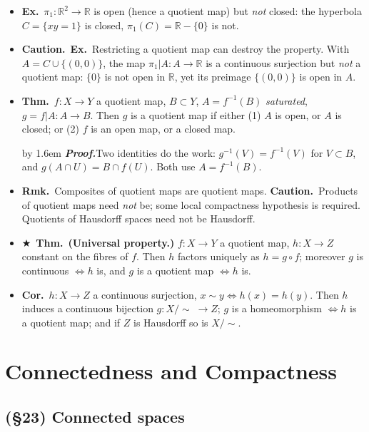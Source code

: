 \documentclass[12pt,a4paper]{article}
\newcommand{\Thm}{\textbf{Thm.}~}
\newcommand{\Cor}{\textbf{Cor.}~}
\newcommand{\Exa}{\textbf{Ex.}~}
\newcommand{\Rmk}{\textbf{Rmk.}~}
\newcommand{\Warn}{\textbf{Caution.}~}
\newcommand{\Key}{$\bigstar$~}                  %
\newcommand{\Pf}[1]{%
  \par\addvspace{7pt}\nopagebreak
  \begingroup
    \advance\leftskip by 1.6em
    \parindent=0pt \small\color{prf}%
    \textbf{\textit{Proof.}}\enspace #1\par
  \endgroup
  \addvspace{9pt}}
\newenvironment{BL}%
  {\begin{itemize}[leftmargin=1.4em,labelsep=0.55em,itemsep=11pt,topsep=11pt,parsep=0pt]}%
  {\end{itemize}}
\newcommand{\RR}{\mathbb{R}}
\renewcommand{\iff}{\Leftrightarrow}
\begin{document}
\begin{BL}
      $\{\emptyset,\{n\},\{p\},\{n,p\},Y\}$: not Hausdorff; $z$ is the only closed point.
\item \Exa $\pi_1\colon\RR^2\to\RR$ is open (hence a quotient map) but \emph{not} closed:
      the hyperbola $C=\{xy=1\}$ is closed, $\pi_1(C)=\RR-\{0\}$ is not.
\item \Warn \Exa Restricting a quotient map can destroy the property.
      With $A=C\cup\{(0,0)\}$, the map $\pi_1|A\colon A\to\RR$ is a continuous surjection but
      \emph{not} a quotient map: $\{0\}$ is not open in $\RR$, yet its preimage $\{(0,0)\}$
      is open in $A$.
\item \Thm $f\colon X\to Y$ a quotient map, $B\subset Y$, $A=f^{-1}(B)$ \emph{saturated},
      $g=f|A\colon A\to B$. Then $g$ is a quotient map if either
      (1) $A$ is open, or $A$ is closed; or (2) $f$ is an open map, or a closed map.
\Pf{Two identities do the work: $g^{-1}(V)=f^{-1}(V)$ for $V\subset B$, and
$g(A\cap U)=B\cap f(U)$. Both use $A=f^{-1}(B)$.}
\item \Rmk Composites of quotient maps are quotient maps.
      \Warn Products of quotient maps need \emph{not} be; some local compactness hypothesis
      is required. Quotients of Hausdorff spaces need not be Hausdorff.
\item \Key\Thm \textbf{(Universal property.)} $f\colon X\to Y$ a quotient map,
      $h\colon X\to Z$ constant on the fibres of $f$. Then $h$ factors uniquely as $h=g\circ f$;
      moreover $g$ is continuous $\iff h$ is, and $g$ is a quotient map $\iff h$ is.
\item \Cor $h\colon X\to Z$ a continuous surjection, $x\sim y\iff h(x)=h(y)$.
      Then $h$ induces a continuous bijection $g\colon X/\!\!\sim\;\to Z$;
      $g$ is a homeomorphism $\iff h$ is a quotient map;
      and if $Z$ is Hausdorff so is $X/\!\!\sim$.
\end{BL}

\section{Connectedness and Compactness}

\subsection{(\S23) Connected spaces}
\end{document}
